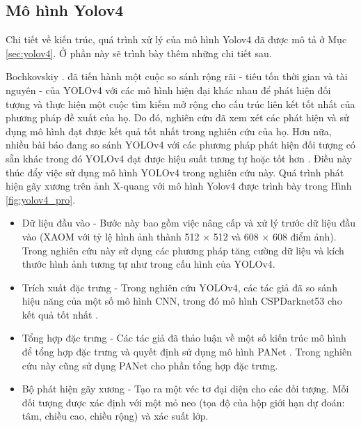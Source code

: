 \documentclass[../the.tex]{subfiles}
\begin{document}
\subsection{Mô hình Yolov4}

{\fontsize{13}{12} \selectfont
Chi tiết về kiến trúc, quá trình xử lý của mô hình Yolov4 đã được mô tả ở Mục \ref{sec:yolov4}. Ở phần này sẽ trình bày thêm những chi tiết sau.

Bochkovskiy \etal. \cite{Bochkovskiy2020YOLOv4OS} đã tiến hành một cuộc so sánh rộng rãi - tiêu tốn thời gian và tài nguyên - của YOLOv4 với các mô hình hiện đại khác nhau để phát hiện đối tượng và thực hiện một cuộc tìm kiếm mở rộng cho cấu trúc liên kết tốt nhất của phương pháp đề xuất của họ. Do đó, nghiên cứu đã xem xét các phát hiện và sử dụng mô hình đạt được kết quả tốt nhất trong nghiên cứu của họ. Hơn nữa, nhiều bài báo đang so sánh YOLOv4 với các phương pháp phát hiện đối tượng có sẵn khác trong đó YOLOv4 đạt được hiệu suất tương tự hoặc tốt hơn \cite{s20174938,WU2020105742,9079965,Aly2021YOLOVA}. Điều này thúc đẩy việc sử dụng mô hình YOLOv4 trong nghiên cứu này. Quá trình phát hiện gãy xương trên ảnh X-quang với mô hình Yolov4 được trình bày trong Hình \ref{fig:yolov4_pro}.

\begin{itemize}
  \item Dữ liệu đầu vào - Bước này bao gồm việc nâng cấp và xử lý trước dữ liệu đầu vào (XAOM với tỷ lệ hình ảnh thành 512 × 512 và 608 × 608 điểm ảnh). Trong nghiên cứu này sử dụng các phương pháp tăng cường dữ liệu và kích thước hình ảnh tương tự như trong cấu hình của YOLOv4.

  \item Trích xuất đặc trưng - Trong nghiên cứu YOLOv4, các tác giả đã so sánh hiệu năng của một số mô hình CNN, trong đó mô hình CSPDarknet53 cho kết quả tốt nhất \cite{9150780}.
 
   \item Tổng hợp đặc trưng - Các tác giả đã thảo luận về một số kiến trúc mô hình để tổng hợp đặc trưng và quyết định sử dụng mô hình PANet \cite{8579011}. Trong nghiên cứu này cũng sử dụng PANet cho phần tổng hợp đặc trưng.
   
   \item Bộ phát hiện gãy xương - Tạo ra một véc tơ đại diện cho các đối tượng. Mỗi đối tượng được xác định với một mỏ neo (tọa độ của hộp giới hạn dự đoán: tâm, chiều cao, chiều rộng) và xác suất lớp.
\end{itemize}
}
\end{document}
